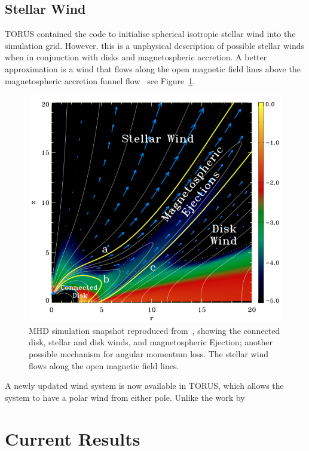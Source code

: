 \documentclass[fleqn,usenatbib]{mnras}
\begin{document}
\subsection{Stellar Wind}
TORUS contained the code to initialise spherical isotropic stellar wind into the simulation grid. However, this is a unphysical description of possible stellar winds when in conjunction with disks and magnetospheric accretion. A better approximation is a wind that flows along the open magnetic field lines above the magnetospheric accretion funnel flow~\citep[e.g.][]{2009A&A...508.1117Z} see Figure~\ref{fig:zanni}.
\begin{figure}
    \centering
    \includegraphics[width=\linewidth]{figures/zanni}
    \caption{MHD simulation snapshot reproduced from~\citet{2009A&A...508.1117Z}, showing the connected disk, stellar and disk winds, and magnetospheric Ejection; another possible mechanism for angular momentum loss. The stellar wind flows along the open magnetic field lines.}
    \label{fig:zanni}
\end{figure}

A newly updated wind system is now available in TORUS, which allows the system to have a polar wind from either pole. Unlike the work by~

\section{Current Results}
\label{sec:results}
\end{document}
